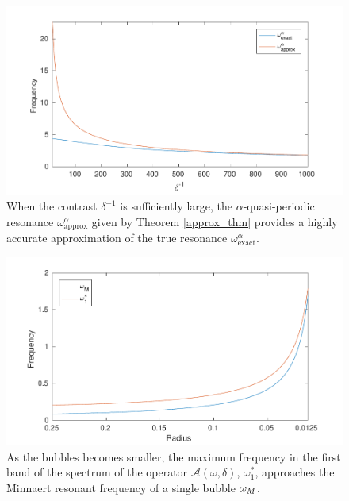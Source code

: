 \documentclass[11pt]{article}
\numberwithin{equation}{section}
\newcommand\1{{\ensuremath {\mathds 1} }}
\begin{document}
{{\begin{figure}
\begin{center}
\includegraphics[width = 6in]{omBiperiodicApprox_vs_omBiperiodic}
  \caption{When the contrast $\delta^{-1}$ is sufficiently large, the $\alpha$-quasi-periodic resonance $\omega_\text{approx}^\alpha$ given by Theorem \ref{approx_thm} provides a highly accurate approximation of the true resonance $\omega_\text{exact}^\alpha$.}
\label{fig:alpha-qp-formula}
\end{center}
\end{figure}

\begin{figure} [ht]
\begin{center}
\includegraphics[width = 6in]{omSingle_vs_maxOmBand}
  \caption{As the bubbles becomes smaller, the maximum frequency in the first band of the spectrum of the operator $\mathcal{A}(\omega, \delta)$, $\omega_1^\ast$,  approaches the Minnaert resonant frequency of a single bubble $\omega_M$.}
\label{fig:dilute-regime}
\end{center}
\end{figure}

}}
\end{document}
